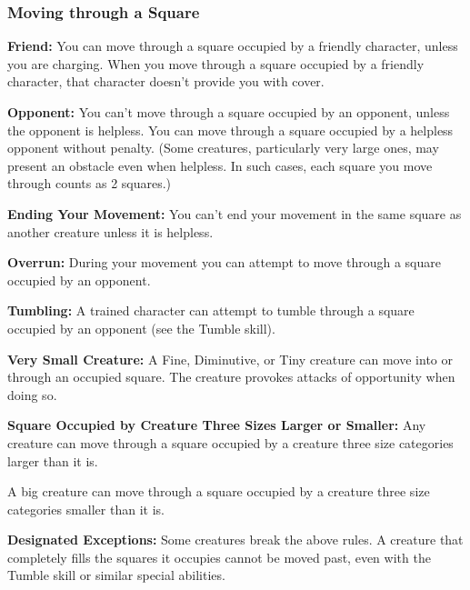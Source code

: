 \subsubsection{Moving through a Square}
\textbf{Friend:} You can move through a square occupied by a friendly character, unless you are charging. When you move through a square occupied by a friendly character, that character doesn't provide you with cover.

\textbf{Opponent:} You can't move through a square occupied by an opponent, unless the opponent is helpless. You can move through a square occupied by a helpless opponent without penalty. (Some creatures, particularly very large ones, may present an obstacle even when helpless. In such cases, each square you move through counts as 2 squares.)

\textbf{Ending Your Movement:} You can't end your movement in the same square as another creature unless it is helpless.

\textbf{Overrun:} During your movement you can attempt to move through a square occupied by an opponent.

\textbf{Tumbling:} A trained character can attempt to tumble through a square occupied by an opponent (see the Tumble skill).

\textbf{Very Small Creature:} A Fine, Diminutive, or Tiny creature can move into or through an occupied square. The creature provokes attacks of opportunity when doing so.

\textbf{Square Occupied by Creature Three Sizes Larger or Smaller:} Any creature can move through a square occupied by a creature three size categories larger than it is.

A big creature can move through a square occupied by a creature three size categories smaller than it is.

\textbf{Designated Exceptions:} Some creatures break the above rules. A creature that completely fills the squares it occupies cannot be moved past, even with the Tumble skill or similar special abilities.
